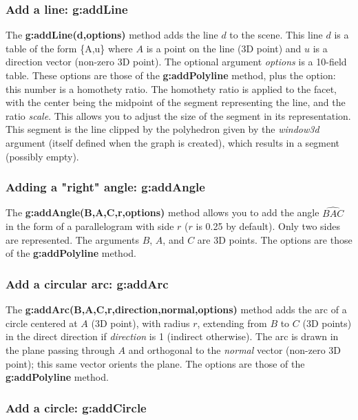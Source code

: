     
\subsubsection{Add a line: g:addLine}

The \textbf{g:addLine(d,options)} method adds the line $d$ to the scene. This line $d$ is a table of the form \{A,u\} where $A$ is a point on the line (3D point) and $u$ is a direction vector (non-zero 3D point). The optional argument \emph{options} is a 10-field table. These options are those of the \textbf{g:addPolyline} method, plus the  option: this number is a homothety ratio. The homothety ratio is applied to the facet, with the center being the midpoint of the segment representing the line, and the ratio \emph{scale}. This allows you to adjust the size of the segment in its representation. This segment is the line clipped by the polyhedron given by the \emph{window3d} argument (itself defined when the graph is created), which results in a segment (possibly empty).

\subsubsection{Adding a "right" angle: g:addAngle}

The \textbf{g:addAngle(B,A,C,r,options)} method allows you to add the angle $\widehat{BAC}$ in the form of a parallelogram with side $r$ ($r$ is 0.25 by default). Only two sides are represented. The arguments $B$, $A$, and $C$ are 3D points. The options are those of the \textbf{g:addPolyline} method.

\subsubsection{Add a circular arc: g:addArc}

The \textbf{g:addArc(B,A,C,r,direction,normal,options)} method adds the arc of a circle centered at $A$ (3D point), with radius $r$, extending from $B$ to $C$ (3D points) in the direct direction if \emph{direction} is 1 (indirect otherwise). The arc is drawn in the plane passing through $A$ and orthogonal to the \emph{normal} vector (non-zero 3D point); this same vector orients the plane. The options are those of the \textbf{g:addPolyline} method.

\subsubsection{Add a circle: g:addCircle}

